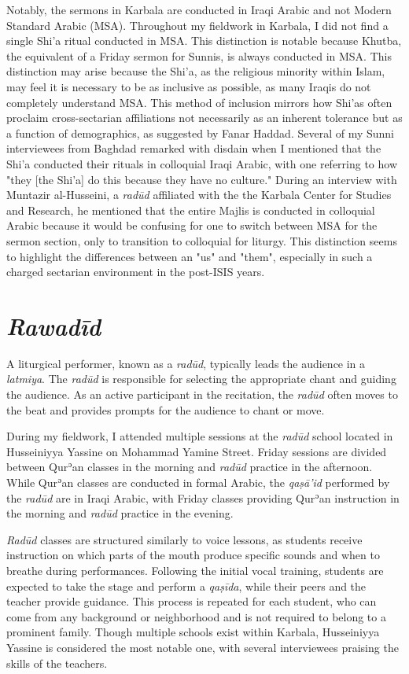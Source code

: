 Notably, the sermons in Karbala are conducted in Iraqi Arabic and not Modern Standard Arabic (MSA). Throughout my fieldwork in Karbala, I did not find a single Shi'a ritual conducted in MSA. This distinction is notable because Khutba, the equivalent of a Friday sermon for Sunnis, is always conducted in MSA. This distinction may arise because the Shi'a, as the religious minority within Islam, may feel it is necessary to be as inclusive as possible, as many Iraqis do not completely understand MSA. This method of inclusion mirrors how Shi'as often proclaim cross-sectarian affiliations not necessarily as an inherent tolerance but as a function of demographics, as suggested by Fanar Haddad\cite[183]{haddad_understanding_2020}. Several of my Sunni interviewees from Baghdad remarked with disdain when I mentioned that the Shi'a conducted their rituals in colloquial Iraqi Arabic, with one referring to how "they [the Shi'a] do this because they have no culture." During an interview with Muntazir al-Husseini, a \emph{radūd} affiliated with the the Karbala Center for Studies and Research, he mentioned that the entire Majlis is conducted in colloquial Arabic because it would be confusing for one to switch between MSA for the sermon section, only to transition to colloquial for liturgy. This distinction seems to highlight the differences between an "us" and "them", especially in such a charged sectarian environment in the post-ISIS years. 

\section{\emph{Rawadīd}} \label{radood-section}
A liturgical performer, known as a \emph{radūd}, typically leads the audience in a \emph{latmiya}. The \emph{radūd} is responsible for selecting the appropriate chant and guiding the audience. As an active participant in the recitation, the \emph{radūd} often moves to the beat and provides prompts for the audience to chant or move.

During my fieldwork, I attended multiple sessions at the \emph{radūd} school located in Husseiniyya Yassine on Mohammad Yamine Street. Friday sessions are divided between Qurʾan classes in the morning and \emph{radūd} practice in the afternoon. While Qurʾan classes are conducted in formal Arabic, the \emph{qaṣā’id} performed by the \emph{radūd} are in Iraqi Arabic, with Friday classes providing Qurʾan instruction in the morning and \emph{radūd} practice in the evening.

\emph{Radūd} classes are structured similarly to voice lessons, as students receive instruction on which parts of the mouth produce specific sounds and when to breathe during performances. Following the initial vocal training, students are expected to take the stage and perform a \emph{qaṣīda}, while their peers and the teacher provide guidance. This process is repeated for each student, who can come from any background or neighborhood and is not required to belong to a prominent family. Though multiple schools exist within Karbala, Husseiniyya Yassine is considered the most notable one, with several interviewees praising the skills of the teachers.

